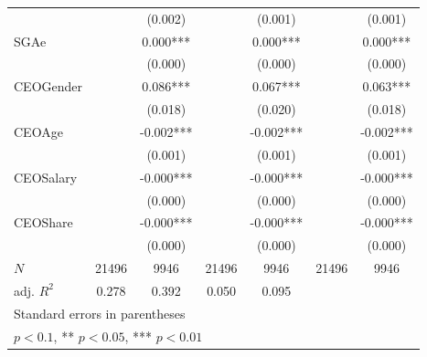 \begin{table}[htbp]
\begin{tabular}{l*{6}{c}}
            &               &     (0.002)   &               &     (0.001)   &               &     (0.001)   \\
[1em]
SGAe        &               &       0.000***&               &       0.000***&               &       0.000***\\
            &               &     (0.000)   &               &     (0.000)   &               &     (0.000)   \\
[1em]
CEOGender   &               &       0.086***&               &       0.067***&               &       0.063***\\
            &               &     (0.018)   &               &     (0.020)   &               &     (0.018)   \\
[1em]
CEOAge      &               &      -0.002***&               &      -0.002***&               &      -0.002***\\
            &               &     (0.001)   &               &     (0.001)   &               &     (0.001)   \\
[1em]
CEOSalary   &               &      -0.000***&               &      -0.000***&               &      -0.000***\\
            &               &     (0.000)   &               &     (0.000)   &               &     (0.000)   \\
[1em]
CEOShare    &               &      -0.000***&               &      -0.000***&               &      -0.000***\\
            &               &     (0.000)   &               &     (0.000)   &               &     (0.000)   \\
\hline
\(N\)       &       21496   &        9946   &       21496   &        9946   &       21496   &        9946   \\
adj. \(R^{2}\)&       0.278   &       0.392   &       0.050   &       0.095   &               &               \\
\hline\hline
\multicolumn{7}{l}{\footnotesize Standard errors in parentheses}\\
\multicolumn{7}{l}{\footnotesize * \(p<0.1\), ** \(p<0.05\), *** \(p<0.01\)}\\
\end{tabular}
\end{table}
